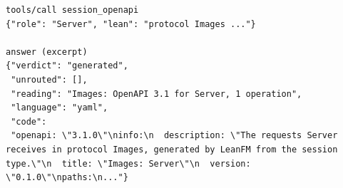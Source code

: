 \begin{lstlisting}[language={},basicstyle=\ttfamily\footnotesize,breaklines=true]
tools/call session_openapi
{"role": "Server", "lean": "protocol Images ..."}

answer (excerpt)
{"verdict": "generated",
 "unrouted": [],
 "reading": "Images: OpenAPI 3.1 for Server, 1 operation",
 "language": "yaml",
 "code":
 "openapi: \"3.1.0\"\ninfo:\n  description: \"The requests Server receives in protocol Images, generated by LeanFM from the session type.\"\n  title: \"Images: Server\"\n  version: \"0.1.0\"\npaths:\n..."}
\end{lstlisting}

